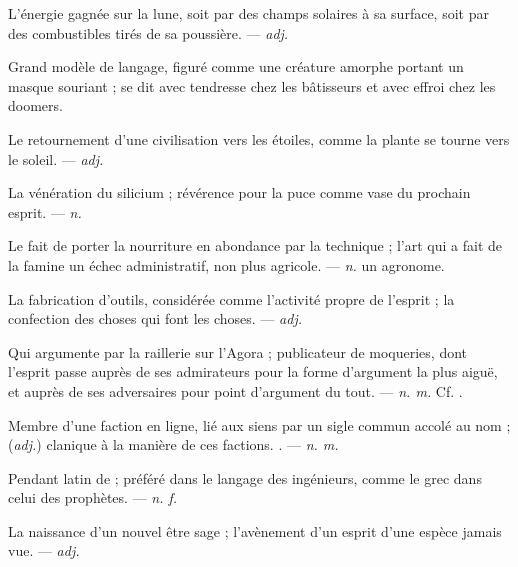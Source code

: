  L'énergie gagnée sur la lune, soit par des champs solaires à sa surface, soit par des combustibles tirés de sa poussière. ---  \textit{adj.}

  Grand modèle de langage, figuré comme une créature amorphe portant un masque souriant ; se dit avec tendresse chez les bâtisseurs et avec effroi chez les doomers.

 Le retournement d'une civilisation vers les étoiles, comme la plante se tourne vers le soleil. ---  \textit{adj.}

 La vénération du silicium ; révérence pour la puce comme vase du prochain esprit. ---  \textit{n.}

 Le fait de porter la nourriture en abondance par la technique ; l'art qui a fait de la famine un échec administratif, non plus agricole. ---  \textit{n.} un agronome.

 La fabrication d'outils, considérée comme l'activité propre de l'esprit ; la confection des choses qui font les choses. ---  \textit{adj.}

 Qui argumente par la raillerie sur l'Agora ; publicateur de moqueries, dont l'esprit passe auprès de ses admirateurs pour la forme d'argument la plus aiguë, et auprès de ses adversaires pour point d'argument du tout.   ---  \textit{n. m.} Cf. .

 Membre d'une faction en ligne, lié aux siens par un sigle commun accolé au nom ; (\textit{adj.}) clanique à la manière de ces factions. . ---  \textit{n. m.}

 Pendant latin de  ; préféré dans le langage des ingénieurs, comme le grec dans celui des prophètes. ---  \textit{n. f.}

 La naissance d'un nouvel être sage ; l'avènement d'un esprit d'une espèce jamais vue. ---  \textit{adj.}
